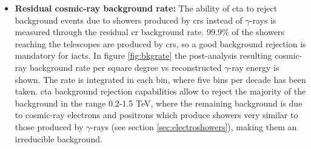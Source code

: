 \documentclass[main.tex]{subfiles}
\begin{document}
\begin{itemize}
\item \textbf{Residual cosmic-ray background rate:} The ability of \gls{cta} to reject background events due to showers produced by \glspl{cr} instead of $\gamma$-rays is measured through the residual \gls{cr} background rate. 99.9\% of the showers reaching the telescopes are produced by \glspl{cr}, so a good background rejection is mandatory for \glspl{iact}. In figure \ref{fig:bkgrate} the post-analysis resulting cosmic-ray background rate per square degree vs reconstructed $\gamma$-ray energy is shown. The rate is integrated in each bin, where five bins per decade has been taken. \gls{cta} background rejection capabilities allow to reject the majority of the background in the range 0.2-1.5 TeV, where the remaining background is due to cosmic-ray electrons and positrons \cite{2017ICRCCTAPerformance} which produce showers very similar to those produced by $\gamma$-rays (see section \ref{sec:electroshowers}), making them an irreducible background.\\


\end{itemize}
\end{document}
